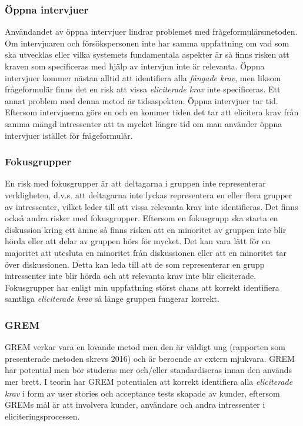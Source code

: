 \subsubsection{Öppna intervjuer}
Användandet av öppna intervjuer lindrar problemet med frågeformulärsmetoden. Om intervjuaren och försökspersonen inte har samma uppfattning om vad som ska utvecklas eller vilka systemets fundamentala aspekter är så finns risken att kraven som specificeras med hjälp av intervjun inte är relevanta. Öppna intervjuer kommer nästan alltid att identifiera alla \textit{fångade krav}, men liksom frågeformulär finns det en risk att vissa \textit{eliciterade krav} inte specificeras. Ett annat problem med denna metod är tidsaspekten. Öppna intervjuer tar tid. Eftersom intervjuerna görs en och en kommer tiden det tar att elicitera krav från samma mängd intressenter att ta mycket längre tid om man använder öppna intervjuer istället för frågeformulär.  

\subsubsection{Fokusgrupper}
En risk med fokusgrupper är att deltagarna i gruppen inte representerar verkligheten, d.v.s. att deltagarna inte lyckas representera en eller flera grupper av intressenter, vilket leder till att vissa relevanta krav inte identifieras. Det finns också andra risker med fokusgrupper. Eftersom en fokusgrupp ska starta en diskussion kring ett ämne så finns risken att en minoritet av gruppen inte blir hörda eller att delar av gruppen hörs för mycket. Det kan vara lätt för en majoritet att utesluta en minoritet från diskussionen eller att en minoritet tar över diskussionen. Detta kan leda till att de som representerar en grupp intressenter inte blir hörda och att relevanta krav inte blir eliciterade. Fokusgrupper har enligt min uppfattning störst chans att korrekt identifiera samtliga \textit{eliciterade krav} så länge gruppen fungerar korrekt.

\subsubsection{GREM}
GREM verkar vara en lovande metod men den är väldigt ung (rapporten som presenterade metoden skrevs 2016) och är beroende av extern mjukvara. GREM har potential men bör studeras mer och/eller standardiseras innan den används mer brett. I teorin har GREM potentialen att korrekt identifiera alla \textit{eliciterade krav} i form av user stories och acceptance tests skapade av kunder, eftersom GREMs mål är att involvera kunder, användare och andra intressenter i eliciteringsprocessen.

